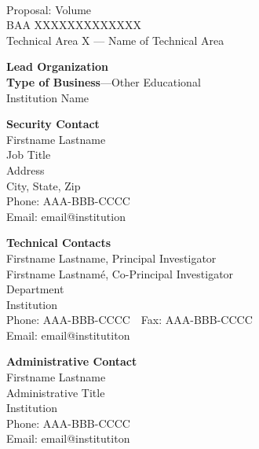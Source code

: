 \begin{center}
  {\large\textbf{\covertitle}} \\
  Proposal: Volume \volume \\
  BAA XXXXXXXXXXXXX \\
  Technical Area X --- Name of Technical Area \\
  \textbf{\thetitle}
\end{center}

{
  \footnotesize

\begin{minipage}[t]{0.5\textwidth}
  \textbf{Lead Organization} \\
  \textbf{Type of Business}---Other Educational \\
  Institution Name \\
\end{minipage}
\begin{minipage}[t]{0.5\textwidth}
  \textbf{Security Contact} \\
  Firstname Lastname \\
  Job Title \\
  Address \\
  City, State, Zip \\
  Phone: AAA-BBB-CCCC \\
  Email: email@institution
\end{minipage}

\vspace{1em}

\begin{minipage}[t]{0.5\textwidth}
  \textbf{Technical Contacts} \\
  Firstname Lastname, Principal Investigator \\
  Firstname Lastnam\'e, Co-Principal Investigator \\
  Department \\
  Institution \\
  Phone: AAA-BBB-CCCC~~Fax: AAA-BBB-CCCC \\
  Email: email@institutiton
\end{minipage}
\begin{minipage}[t]{0.5\textwidth}
  \textbf{Administrative Contact} \\  
  Firstname Lastname \\
  Administrative Title \\
  Institution \\
  Phone: AAA-BBB-CCCC \\
  Email: email@institutiton
\end{minipage}

}

